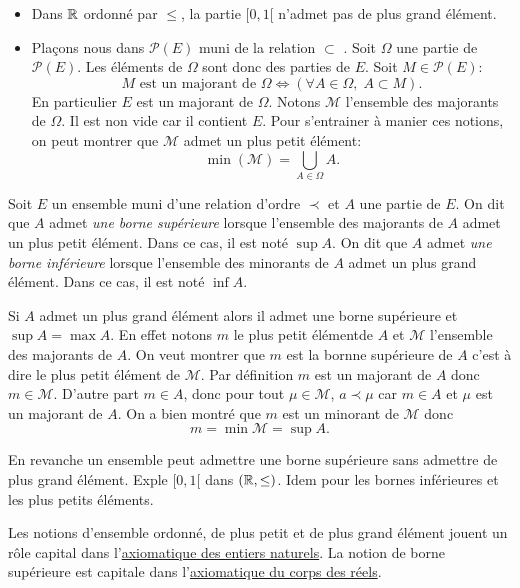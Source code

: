 \begin{exples}
\begin{itemize}
  \item Dans $\mathbb{R}$ ordonné par $\leq$, la partie $[0,1[$ n'admet pas de plus grand élément.
  \item Plaçons nous dans $\mathcal P(E)$ muni de la relation \og $\subset$ \fg. Soit $\Omega$ une partie de $\mathcal P(E)$.  Les éléments de $\Omega$ sont donc des parties de $E$. Soit $M \in \mathcal{P}(E)$:
\[
  M \text{ est un majorant de } \Omega \Leftrightarrow  \left( \forall A \in \Omega, \; A \subset M \right).
\]
En particulier $E$ est un majorant de $\Omega$. Notons $\mathcal{M}$ l'ensemble des majorants de $\Omega$. Il est non vide car il contient $E$. Pour s'entrainer à manier ces notions, on peut montrer que $\mathcal{M}$ admet un plus petit élément:  
\[
 \min(\mathcal{M}) = \bigcup_{A\in \Omega}A .
\]
\end{itemize}
\end{exples}

 
  
\begin{defi}
  Soit $E$ un ensemble muni d'une relation d'ordre $\prec$ et $A$ une partie de $E$.\newline
On dit que $A$ admet \emph{une borne supérieure} lorsque l'ensemble des majorants de $A$ admet un plus petit élément. Dans ce cas, il est noté $\sup A$.\newline
On dit que $A$ admet \emph{une borne inférieure} lorsque l'ensemble des minorants de $A$ admet un plus grand élément. Dans ce cas, il est noté $\inf A$.
\end{defi}
\begin{rem}
 Si $A$ admet un plus grand élément alors il admet une borne supérieure et $\sup A = \max A$.\newline
En effet notons $m$ le plus petit élémentde $A$ et $\mathcal{M}$ l'ensemble des majorants de $A$. On veut montrer que $m$ est la bornne supérieure de $A$ c'est à dire le plus petit élément de $\mathcal{M}$. Par définition $m$ est un majorant de $A$ donc $m\in \mathcal{M}$. D'autre part $m\in A$, donc pour tout $\mu \in \mathcal{M}$, $a \prec \mu$ car $m\in A$ et $\mu$ est un majorant de $A$. On a bien montré que $m$ est un minorant de $\mathcal{M}$ donc
\[
 m = \min \mathcal{M} = \sup A.
\]

En revanche un ensemble peut admettre une borne supérieure sans admettre de plus grand élément. Exple $[0,1[$ dans $(\mathbb{R},\leq)$. Idem pour les bornes inférieures et les plus petits éléments. 
\end{rem}
Les notions d'ensemble ordonné, de plus petit et de plus grand élément jouent un rôle capital dans l'\href{\baseurl C2007.pdf}{axiomatique des entiers naturels}.
La notion de borne supérieure est capitale dans l'\href{\baseurl C2192.pdf}{axiomatique du corps des réels}.


